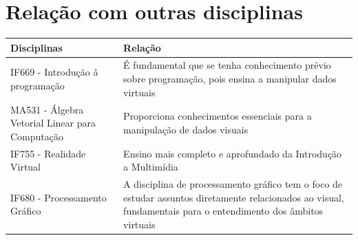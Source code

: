 \documentclass{article}
\begin{document}
\section{Relação com outras disciplinas}


\vspace{0.3cm}
\begin{tabular}{|p{3.0cm}|p{7.0cm}|}
\hline
Disciplinas & Relação\\
\hline


IF669 - Introdução â programação & É fundamental que se tenha conhecimento prévio sobre programação, pois ensina a manipular dados virtuais\\
\hline 
MA531 - Álgebra Vetorial Linear para Computação & Proporciona conhecimentos essenciais para a manipulação de dados visuais \\
\hline 

IF755 - Realidade Virtual & Ensino mais completo e aprofundado da Introdução a Multimídia\\
\hline
IF680 - Processamento Gráfico & A disciplina de processamento gráfico tem o foco de estudar assuntos diretamente relacionados ao visual, fundamentais para o entendimento dos âmbitos virtuais \\
\hline 



\end{tabular}



\nocite{*}
\end{document}
